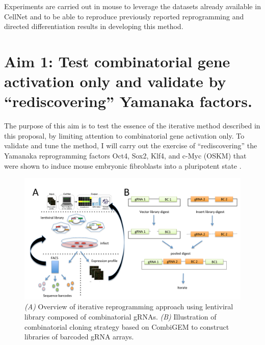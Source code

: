 \documentclass[10pt]{article}
\begin{document}
Experiments are carried out in mouse to leverage the datasets already available in CellNet \cite{cahan2014cellnet} and to be able to reproduce previously reported reprogramming and directed differentiation results in developing this method.

\section{Aim 1: Test combinatorial gene activation only and validate by ``rediscovering'' Yamanaka factors.}

The purpose of this aim is to test the essence of the iterative method described in this proposal, by limiting attention to combinatorial gene activation only. To validate and tune the method, I will carry out the exercise of ``rediscovering'' the Yamanaka reprogramming factors Oct4, Sox2, Klf4, and c-Myc (OSKM) that were shown to induce mouse embryonic fibroblasts into a pluripotent state \cite{takahashi2006induction}.

\begin{figure}
\centering
\includegraphics[width=\textwidth]{fig1}
\caption{\textit{(A)} Overview of iterative reprogramming approach using lentiviral library composed of combinatorial gRNAs. \textit{(B)} Illustration of combinatorial cloning strategy based on CombiGEM \cite{cheng2014enhanced} to construct libraries of barcoded gRNA arrays.}
\label{fig1}
\end{figure}
\end{document}
